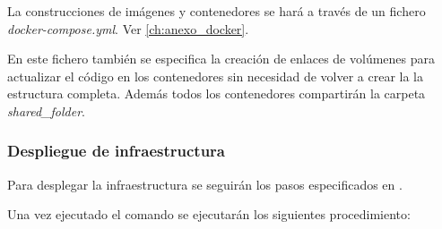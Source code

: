 \documentclass[../main.tex]{subfiles}
\begin{document}
La construcciones de imágenes y contenedores se hará a través de un fichero \textit{docker-compose.yml}. Ver \autoref{ch:anexo_docker}.

En este fichero también se especifica la creación de enlaces de volúmenes para actualizar el código en los contenedores sin necesidad de volver a crear la la estructura completa. Además todos los contenedores compartirán la carpeta \textit{shared\_folder}.

\subsubsection{Despliegue de infraestructura}\label{subsubsec:despliegue}
Para desplegar la infraestructura se seguirán los pasos especificados en .

Una vez ejecutado el comando se ejecutarán los siguientes procedimiento:
\end{document}

